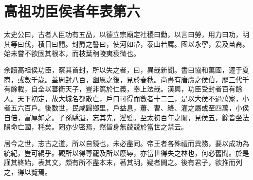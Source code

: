 \chapter{高祖功臣侯者年表第六}

太史公曰，古者人臣功有五品，以德立宗廟定社稷曰勳，以言曰勞，用力曰功，明其等曰伐，積日曰閱。封爵之誓曰，使河如帶，泰山若厲。國以永寧，爰及苗裔。始未嘗不欲固其根本，而枝葉稍陵夷衰微也。

余讀高祖侯功臣，察其首封，所以失之者，曰，異哉新聞。書曰協和萬國，遷于夏商，或數千歲。蓋周封八百，幽厲之後，見於春秋。尚書有唐虞之侯伯，歷三代千有餘載，自全以蕃衛天子，豈非篤於仁義，奉上法哉。漢興，功臣受封者百有餘人。天下初定，故大城名都散亡，戶口可得而數者十二三，是以大侯不過萬家，小者五六百戶。後數世，民咸歸鄉里，戶益息，蕭、曹、絳、灌之屬或至四萬，小侯自倍，富厚如之。子孫驕溢，忘其先，淫嬖。至太初百年之閒，見侯五，餘皆坐法隕命亡國，秏矣。罔亦少密焉，然皆身無兢兢於當世之禁云。

居今之世，志古之道，所以自鏡也，未必盡同。帝王者各殊禮而異務，要以成功為統紀，豈可緄乎。觀所以得尊寵及所以廢辱，亦當世得失之林也，何必舊聞。於是謹其終始，表其文，頗有所不盡本末，著其明，疑者闕之。後有君子，欲推而列之，得以覽焉。


